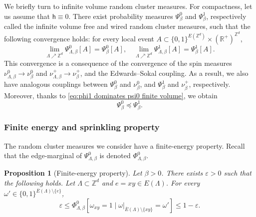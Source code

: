 \documentclass[11pt,a4paper]{article}
\numberwithin{equation}{section}
\theoremstyle{plain}
\newtheorem{Prop}[Thm]{Proposition}
\theoremstyle{definition}
\begin{document}
We briefly turn to infinite volume random cluster measures. For compactness, let us assume that $\mathsf{h}\equiv 0$. There exist probability measures $\Psi^0_{\beta}$ and $\Psi^1_\beta$, respectively called the infinite volume free and wired random cluster measures, such that the following convergence holds: for every local event $A \subset \{0,1\}^{E(\mathbb Z^d)}\times (\mathbb R^+)^{\mathbb Z^d}$,
\begin{equation}
\lim_{\Lambda \nearrow \mathbb Z^d} \Psi^0_{\Lambda,\beta}[A] = \Psi^0_\beta[A], \quad \lim_{\Lambda\nearrow \mathbb Z^d} \Psi^1_{\Lambda,\beta}[A] = \Psi^1_{\beta}[A]. 
\end{equation}
This convergence is a consequence of the convergence of the spin measures $\nu^0_{\Lambda,\beta} \rightarrow \nu^0_\beta$ and $\nu^+_{\Lambda,\beta} \rightarrow \nu^+_\beta$, and the Edwards--Sokal coupling. As a result, we also have analogous couplings between $\Psi^0_\beta$ and $\nu^0_\beta$, and $\Psi^1_\beta$ and $\nu^+_\beta$, respectively. Moreover, thanks to \eqref{eq:phi1 dominates psi0 finite volume}, we obtain
\begin{equation}\label{eq:psi1 dominates psi0}
    \Psi^0_{\beta}\preccurlyeq \Psi^{1}_{\beta}.
\end{equation}


\subsubsection{Finite energy and sprinkling property}

The random cluster measures we consider have a finite-energy property. Recall that the edge-marginal of $\Psi^0_{\Lambda,\beta}$ is denoted $\Phi^0_{\Lambda,\beta}$.
\begin{Prop}[Finite-energy property] \label{prop:finite-energy}
Let $\beta > 0$. There exists $\varepsilon > 0$ such that the following holds. Let $\Lambda \subset \mathbb Z^d$ and $e=xy \in E(\Lambda)$. For every $\omega' \in \{0,1\}^{\overline E(\Lambda)\setminus \{e\}}$,
\begin{equation} \label{eq: finite energy phi}
\varepsilon \leq \Phi^0_{\Lambda,\beta}[\omega_{xy}=1 \mid \omega|_{\overline E(\Lambda)\setminus \{xy\}} = \omega']\leq 1-\varepsilon.
\end{equation}
\end{Prop}
\end{document}
